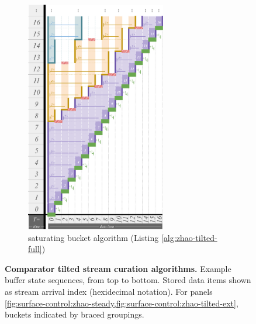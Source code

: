 \begin{figure}
\begin{subfigure}{0.32\linewidth}
\end{subfigure}%
\begin{subfigure}{0.32\linewidth}
\centering
\includegraphics[height=4in,trim={2.5cm 0 0 0},clip]{img/surface-control-tall-zhao-full}
\centering
\caption{saturating bucket algorithm (Listing \ref{alg:zhao-tilted-full})}
\label{fig:surface-control-tilted:saturating-bucket}
\end{subfigure}


\caption{%
\textbf{Comparator tilted stream curation algorithms.}
\footnotesize
Example buffer state sequences, from top to bottom.
Stored data items shown as stream arrival index (hexidecimal notation).
For panels \cref{fig:surface-control:zhao-steady,fig:surface-control:zhao-tilted-ext}, buckets indicated by braced groupings.
}
\label{fig:surface-control-tilted}

\end{figure}
